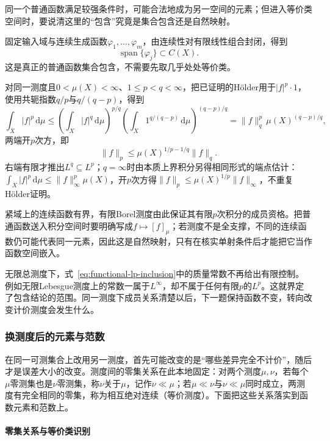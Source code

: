 同一个普通函数满足较强条件时，可能合法地成为另一空间的元素；但进入等价类空间时，要说清这里的“包含”究竟是集合包含还是自然映射。

固定输入域与连续生成函数$\varphi_1,\ldots,\varphi_m$，由连续性对有限线性组合封闭，得到
\[
  \operatorname{span}\{\varphi_j\}\subset C(X).
\]
这是真正的普通函数集合包含，不需要先取几乎处处等价类。

对同一测度且$0<\mu(X)<\infty$、$1\le p<q<\infty$，把已证明的Hölder用于$|f|^p\cdot1$，使用共轭指数$q/p$与$q/(q-p)$，得到
\[
  \int_X|f|^p\,\mathrm d\mu
  \le\left(\int_X|f|^{q}\,\mathrm d\mu\right)^{p/q}
  \left(\int_X1^{q/(q-p)}\,\mathrm d\mu\right)^{(q-p)/q}
  =\|f\|_q^p\,\mu(X)^{(q-p)/q},
\]
两端开$p$次方，即
\begin{equation}
  \|f\|_p\le\mu(X)^{1/p-1/q}\|f\|_q.
  \label{eq:functional-lp-inclusion}
\end{equation}
右端有限才推出$L^q\subseteq L^p$；$q=\infty$时由本质上界积分另得相同形式的端点估计：$\int_X|f|^p\,\mathrm d\mu\le\|f\|_\infty^p\mu(X)$，开$p$次方得$\|f\|_p\le\mu(X)^{1/p}\|f\|_\infty$，不重复Hölder证明。

紧域上的连续函数有界，有限Borel测度由此保证其有限$p$次积分的成员资格。把普通函数送入积分空间时要明确写成$f\mapsto[f]_\mu$；若测度不是全支撑，不同的连续函数仍可能代表同一元素，因此这是自然映射，只有在核实单射条件后才能把它当作函数空间嵌入。

无限总测度下，式~\eqref{eq:functional-lp-inclusion}中的质量常数不再给出有限控制。例如无限Lebesgue测度上的常数一属于$L^\infty$，却不属于任何有限$p$的$L^p$。这就界定了包含结论的范围。同一测度下成员关系清楚以后，下一题保持函数不变，转向改变计价测度会发生什么。

\subsubsection{换测度后的元素与范数}
\label{subsubsec:change-of-measure}

在同一可测集合上改用另一测度，首先可能改变的是“哪些差异完全不计价”，随后才是误差大小的改变。测度间的零集关系在此本地固定：对两个测度$\mu,\nu$，若每个$\mu$零测集也是$\nu$零测集，称$\nu$关于$\mu$，记作$\nu\ll\mu$；若$\mu\ll\nu$与$\nu\ll\mu$同时成立，两测度有完全相同的零集，称为相互绝对连续（等价测度）。下面把这些关系落实到函数元素和范数上。

\paragraph{零集关系与等价类识别}

